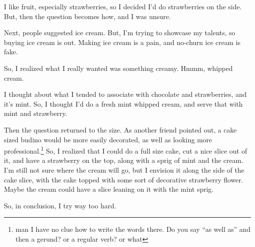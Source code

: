 \documentclass[12pt]{article}[titlepage]
\newcommand{\say}[1]{``#1''}
\newcommand{\1}{\={a}}
\newcommand{\2}{\={e}}
\newcommand{\3}{\={\i}}
\newcommand{\4}{\=o}
\newcommand{\5}{\=u}
\newcommand{\6}{\={A}}
\renewcommand{\,}{\textsuperscript{,}}
\begin{document}
I like fruit, especially strawberries, so I decided I'd do strawberries on the side.
But, then the question becomes how, and I was unsure.

Next, people suggested ice cream.
But, I'm trying to showcase my talents, so buying ice cream is out.
Making ice cream is a pain, and no-churn ice cream is fake.

So, I realized what I really wanted was something creamy.
Hmmm, whipped cream.

I thought about what I tended to associate with chocolate and strawberries, and it's mint.
So, I thought I'd do a fresh mint whipped cream, and serve that with mint and strawberry.

Then the question returned to the size.
As another friend pointed out, a cake sized budino would be more easily decorated, as well as looking more professional.\footnote{man I have no clue how to write the words there. Do you say \say{as well as} and then a gerund? or a regular verb? or what}
So, I realized that I could do a full size cake, cut a nice slice out of it, and have a strawberry on the top, along with a sprig of mint and the cream.
I'm still not sure where the cream will go, but I envision it along the side of the cake slice, with the cake topped with some sort of decorative strawberry flower.
Maybe the cream could have a slice leaning on it with the mint sprig.

So, in conclusion, I try way too hard. 
\end{document}
